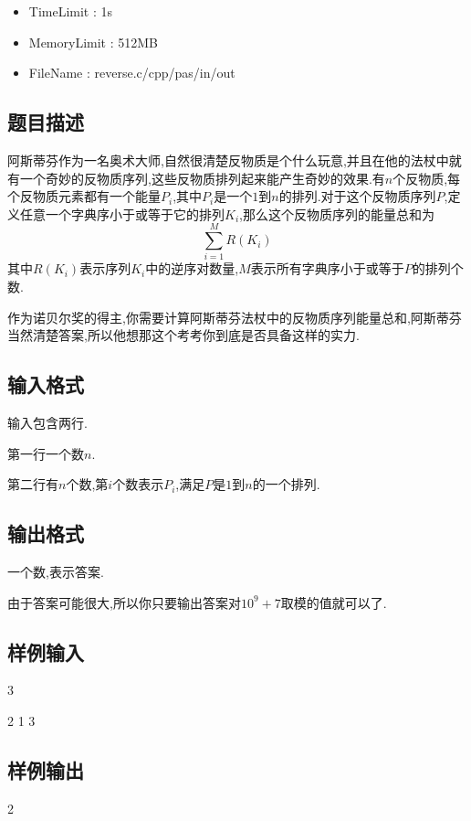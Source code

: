 \documentclass[]{article}
\begin{document}
\begin{itemize}
  
\item TimeLimit : 1s

\item MemoryLimit : 512MB

\item FileName : reverse.c/cpp/pas/in/out
  
\end{itemize}

\subsection{题目描述}

阿斯蒂芬作为一名奥术大师,自然很清楚反物质是个什么玩意,并且在他的法杖中就有一个奇妙的反物质序列,这些反物质排列起来能产生奇妙的效果.有$n$个反物质,每个反物质元素都有一个能量$P_i$,其中$P_i$是一个$1$到$n$的排列.对于这个反物质序列$P$,定义任意一个字典序小于或等于它的排列$K_i$,那么这个反物质序列的能量总和为
\begin{equation}
  \sum^{M}_{i=1}R(K_i)
\end{equation}
其中$R(K_i)$表示序列$K_i$中的逆序对数量,$M$表示所有字典序小于或等于$P$的排列个数.

作为诺贝尔奖的得主,你需要计算阿斯蒂芬法杖中的反物质序列能量总和,阿斯蒂芬当然清楚答案,所以他想那这个考考你到底是否具备这样的实力.

\subsection{输入格式}
输入包含两行.

第一行一个数$n$.

第二行有$n$个数,第$i$个数表示$P_i$,满足$P$是$1$到$n$的一个排列.

\subsection{输出格式}

一个数,表示答案.

由于答案可能很大,所以你只要输出答案对$10^{9}+7$取模的值就可以了.

\subsection{样例输入}
3

2 1 3
\subsection{样例输出}
2
\end{document}
